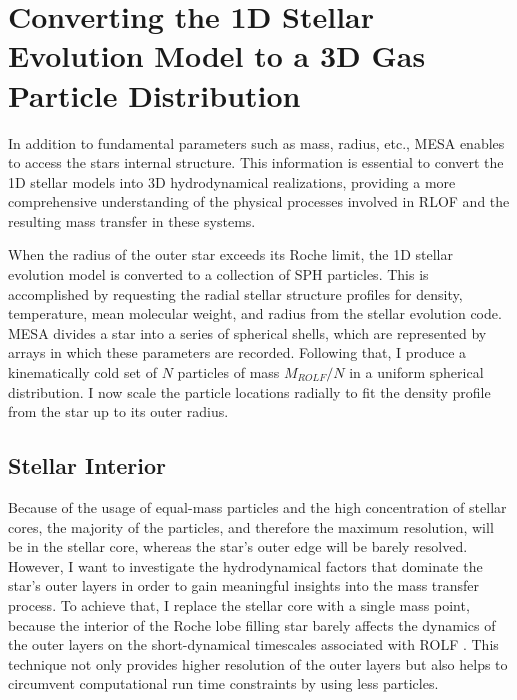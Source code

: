 \section{Converting the 1D Stellar Evolution Model to a 3D Gas Particle Distribution}\label{sec:1D_to_3D}

In addition to fundamental parameters such as mass, radius, etc., MESA enables to access the stars internal structure. This information is essential to convert the 1D stellar models into 3D hydrodynamical realizations, providing a more comprehensive understanding of the physical processes involved in RLOF and the resulting mass transfer in these systems.

When the radius of the outer star exceeds its Roche limit, the 1D stellar evolution model is converted to a collection of SPH particles. This is accomplished by requesting the radial stellar structure profiles for density, temperature, mean molecular weight, and radius from the stellar evolution code. MESA divides a star into a series of spherical shells, which are represented by arrays in which these parameters are recorded. Following that, I produce a kinematically cold set of $N$ particles of mass $M_{ROLF}/N$ in a uniform spherical distribution. I now scale the particle locations radially to fit the density profile from the star up to its outer radius.

\subsection{Stellar Interior}\label{sub:core}

Because of the usage of equal-mass particles and the high concentration of stellar cores, the majority of the particles, and therefore the maximum resolution, will be in the stellar core, whereas the star's outer edge will be barely resolved. However, I want to investigate the hydrodynamical factors that dominate the star's outer layers in order to gain meaningful insights into the mass transfer process. To achieve that, I replace the stellar core with a single mass point, because the interior of the Roche lobe filling star barely affects the dynamics of the outer layers on the short-dynamical timescales associated with ROLF \citep{deupree2005structure}.  This technique not only provides higher resolution of the outer layers but also helps to circumvent computational run time constraints by using less particles.

